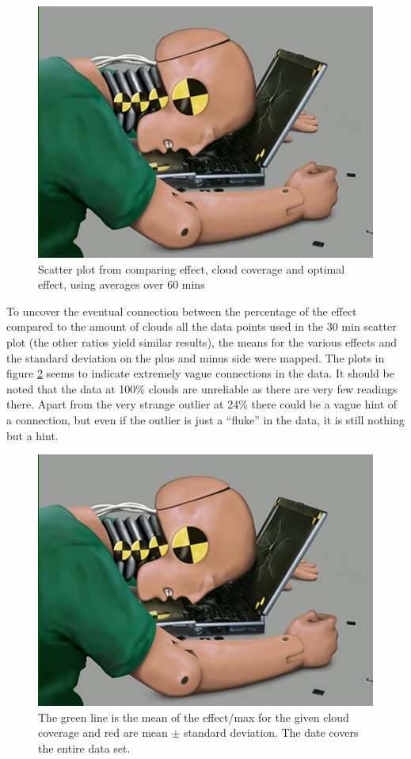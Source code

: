 \begin{figure}
  \centering
  \includegraphics{dummy.jpg}
  \caption{Scatter plot from comparing effect, cloud coverage and
    optimal effect, using averages over 60 mins}
  \label{fig:scatter60}
\end{figure}

To uncover the eventual connection between the percentage of the
effect compared to the amount of clouds all the data points used in
the 30 min scatter plot (the other ratios yield similar results),
the means for the various effects and the standard deviation on the
plus and minus side were mapped.  The plots in figure
\ref{fig:stattotal} seems to indicate extremely vague connections in
the data.  It should be noted that the data at 100\% clouds are
unreliable as there are very few readings there.  Apart from the very
strange outlier at 24\% there could be a vague hint of a connection,
but even if the outlier is just a ``fluke'' in the data, it is still
nothing but a hint.

\begin{figure}
  \centering
  \includegraphics{dummy.jpg}
  \caption{The green line is the mean of the effect/max for the given
    cloud coverage and red are mean $\pm$ standard deviation.  The
    date covers the entire data set.}
  \label{fig:stattotal}
\end{figure}

